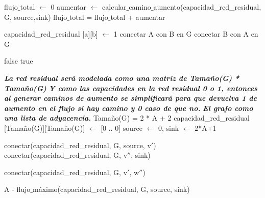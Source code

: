 \begin{algorithmic}
	\State flujo$\_$total $\leftarrow$ 0
	\Repeat 
			\State aumentar $\leftarrow$ calcular$\_$camino$\_$aumento(capacidad_red_residual, G, source,sink)
			\State flujo$\_$total = flujo$\_$total + aumentar
	
\EndFunction
\end{algorithmic}
\hspace{1cm}

\begin{algorithmic}
	\State capacidad_red_residual [a][b] $\leftarrow$ 1
	\State conectar A con B en G
	\State conectar B con A en G
\EndFunction
\end{algorithmic}
\hspace{1cm}


\begin{algorithmic}
			\State \Return false
		\EndIf
	\EndFor	
	\State \Return true
\EndFunction
\end{algorithmic}
\hspace{1cm}

\begin{algorithmic}
	\State \textit{\textbf{La red residual será modelada como una matriz de Tamaño(G) * Tamaño(G)}}
	\State \textit{\textbf{Y como las capacidades en la red residual 0 o 1, entonces al generar caminos de aumento se simplificará para que devuelva 1 de aumento en el flujo si hay camino y 0 caso de que no.}}
	\State \textit{\textbf{El grafo como una lista de adyacencia.}}
	\State Tamaño(G) = 2 * A + 2
	\State capacidad_red_residual [Tamaño(G)][Tamaño(G)] $\leftarrow$ [0 .. 0] 
	\State source $\leftarrow$ 0, sink $\leftarrow$ 2*A+1

		\State conectar(capacidad_red_residual, G, source, v$'$) 
		\State conectar(capacidad_red_residual, G, v$''$, sink) 
	\EndFor

				\State conectar(capacidad_red_residual, G, v$'$, w$''$)
			\EndIf
		\EndFor
	\EndFor
	
	\Return A - flujo$\_$máximo(capacidad_red_residual, G, source, sink)

\EndFunction

\end{algorithmic}


